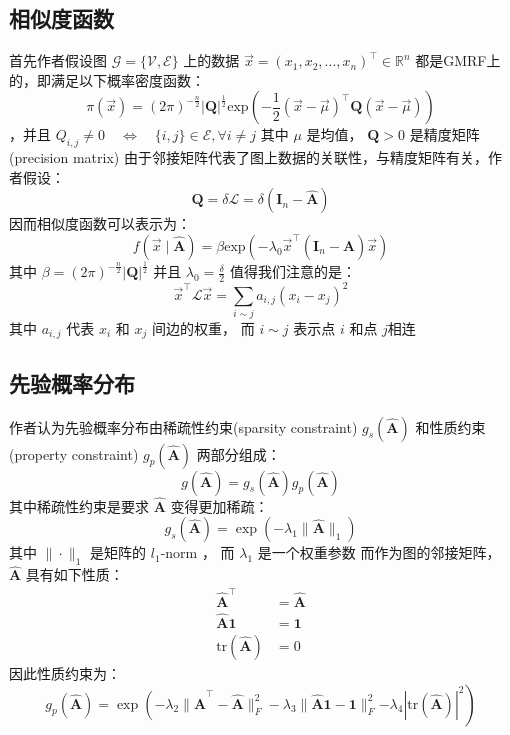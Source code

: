 \documentclass[color=gray,base=hide,cn]{elegantbook}
\begin{document}
\subsection{相似度函数}
首先作者假设图 $\mathcal{G}=\{\mathcal{V},\mathcal{E}\}$ 上的数据 $\vec{x} = (x_1, x_2, ..., x_n)^\top \in \mathbb{R}^n$  都是GMRF上的，即满足以下概率密度函数：
\begin{equation}
    \pi(\vec{x}) = (2\pi)^{-\frac{n}{2}}|\mathbf{Q}|^{\frac{1}{2}} \text{exp}\left(-\frac{1}{2}(\vec{x}-\vec{\mu})^\top\mathbf{Q}(\vec{x}-\vec{\mu})\right)
\end{equation}
，并且 $Q_{i,j} \neq 0 \quad \Longleftrightarrow \quad \{i,j\} \in \mathcal{E}, \forall i \neq j$
其中 $\mu$ 是均值， $\mathbf{Q} > 0$ 是精度矩阵(precision matrix)
由于邻接矩阵代表了图上数据的关联性，与精度矩阵有关，作者假设：
\begin{equation}
    \mathbf{Q} = \delta \mathcal{L} = \delta (\mathbf{I}_n - \mathbf{\hat{A}})
\end{equation}
因而相似度函数可以表示为：
\begin{equation}
    f(\vec{x} \mid \mathbf{\hat{A}}) =\beta \text{exp} \left(-\lambda_0 \vec{x}^\top ( \mathbf{I}_n - \mathbf{\hat{A}} ) \vec{x} \right)
\end{equation}
其中 $\beta=(2\pi)^{-\frac{n}{2}}|\mathbf{Q}|^{\frac{1}{2}}$ 并且 $\lambda_0 = \frac{\delta}{2}$
值得我们注意的是：
\begin{equation}
    \vec{x}^\top \mathcal{L} \vec{x} = \sum\limits_{i \sim j}a_{i,j}(x_i - x_j)^2
\end{equation}
其中 $a_{i,j}$ 代表 $x_i$ 和 $x_j$ 间边的权重， 而 $i \sim j$ 表示点 $i$ 和点 $j$相连
\subsection{先验概率分布}
作者认为先验概率分布由稀疏性约束(sparsity constraint) $ g_s(\mathbf{\hat{A}})$ 和性质约束(property constraint) $g_p(\mathbf{\hat{A}})$ 两部分组成：
\begin{equation}
    g(\mathbf{\hat{A}}) = g_s(\mathbf{\hat{A}})g_p(\mathbf{\hat{A}})
\end{equation}
其中稀疏性约束是要求 $\mathbf{\hat{A}}$ 变得更加稀疏：
\begin{equation}
    g_s(\mathbf{\hat{A}}) = \exp \left( -\lambda_1 \| \mathbf{\hat{A}} \|_1 \right)
\end{equation}
其中 $\| \cdot \|_1$ 是矩阵的 $l_1$-norm ， 而 $\lambda_1$ 是一个权重参数
而作为图的邻接矩阵， $\mathbf{\hat{A}}$ 具有如下性质：
\begin{align}
    \mathbf{\hat{A}}^\top       & = \mathbf{\hat{A}} \\
    \mathbf{\hat{A}}\mathbf{1}  & = \mathbf{1}       \\
    \text{tr}(\mathbf{\hat{A}}) & = 0
\end{align}
因此性质约束为：
\begin{equation}
    g_p(\mathbf{\hat{A}}) = \exp \left( -\lambda_2 \| \mathbf{\hat{A}}^\top - \mathbf{\hat{A}} \|_F^2 -\lambda_3 \| \mathbf{\hat{A}}\mathbf{1} - \mathbf{1} \|_F^2 \right. \left. -\lambda_4 | \text{tr}(\mathbf{\hat{A}}) |^2 \right)
\end{equation}
\end{document}
